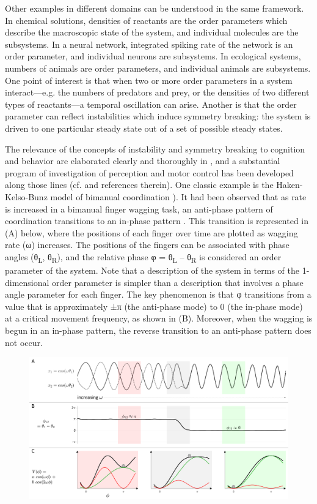   Other examples in different domains can be understood in the same framework. In chemical solutions, densities of reactants are the order parameters which describe the macroscopic state of the system, and individual molecules are the subsystems. In a neural network, integrated spiking rate of the network is an order parameter, and individual neurons are subsystems. In ecological systems, numbers of animals are order parameters, and individual animals are subsystems. One point of interest is that when two or more order parameters in a system interact—e.g. the numbers of predators and prey, or the densities of two different types of reactants—a temporal oscillation can arise. Another is that the order parameter can reflect instabilities which induce symmetry breaking: the system is driven to one particular steady state out of a set of possible steady states. 

The relevance of the concepts of instability and symmetry breaking to cognition and behavior are elaborated clearly and thoroughly in \citet{Kelso1997}, and a substantial program of investigation of perception and motor control has been developed along those lines (cf. \citet{Kelso1997} and references therein). One classic example is the Haken-Kelso-Bunz model of bimanual coordination \citep{HakenEtAl1985,SchonerKelso1988}). It had been observed that as rate is increased in a bimanual finger wagging task, an anti-phase pattern of coordination transitions to an in-phase pattern \citep{KelsoEtAl1981}. This transition is represented in (A) below, where the positions of each finger over time are plotted as wagging rate (ω) increases. The positions of the fingers can be associated with phase angles (θ\textsubscript{L}, θ\textsubscript{R}), and the relative phase φ = θ\textsubscript{L} – θ\textsubscript{R} is considered an order parameter of the system. Note that a description of the system in terms of the 1-dimensional order parameter is simpler than a description that involves a phase angle parameter for each finger. The key phenomenon is that φ transitions from a value that is approximately ±π (the anti-phase mode) to 0 (the in-phase mode) at a critical movement frequency, as shown in (B). Moreover, when the wagging is begun in an in-phase pattern, the reverse transition to an anti-phase pattern does not occur.

  
\begin{figure}
\includegraphics[width=\textwidth]{figures/Tilsen-img167.png}
\caption{\missingcaption}
\label{fig:8:1}
\end{figure}
 

